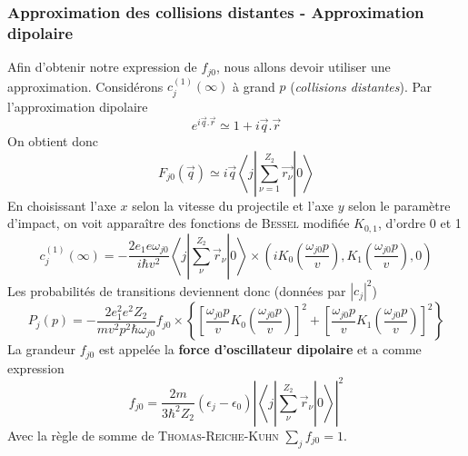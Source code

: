 \subsubsection{Approximation des collisions distantes - Approximation dipolaire}
Afin d'obtenir notre expression de $f_{j0}$, nous allons devoir utiliser une approximation. 
Considérons $c_j^{(1)}(\infty)$ à grand $p$ (\textit{collisions distantes}). Par l'approximation
dipolaire
\begin{equation}
e^{i\overrightarrow{q}.\overrightarrow{r}}\simeq 1+i\overrightarrow{q}.\overrightarrow{r}
\end{equation}
On obtient donc
\begin{equation}
F_{j0}(\overrightarrow{q})\simeq i\overrightarrow{q}\left\langle j\left| \sum_{\nu=1}^{Z_2}\overrightarrow{r_\nu}\right| 0\right\rangle
\end{equation}
En choisissant l'axe $x$ selon la vitesse du projectile et l'axe $y$ selon le paramètre 
d'impact, on voit apparaître des fonctions de \textsc{Bessel} modifiée $K_{0,1}$, d'ordre 0 et 1
\begin{equation}
c_j^{(1)}(\infty)=-\frac{2e_1e\omega_{j0}}{i\hbar v^2}\left\langle j\left| \sum_{\nu}^{Z_2}\overrightarrow{r}_\nu \right|0\right\rangle
 \times\left(iK_0\left(\frac{\omega_{j0}p}{v}\right),K_1\left(\frac{\omega_{j0}p}{v}\right),0\right)
\end{equation}
Les probabilités de transitions deviennent donc (données par $|c_j|^2$)
\begin{equation}
P_j(p)=-\frac{2e_1^2e^2Z_2}{mv^2p^2\hbar\omega_{j0}}f_{j0}
 \times\left\{\left[\frac{\omega_{j0}p}{v}K_0\left(\frac{\omega_{j0}p}{v}\right)\right]^2+\left[\frac{\omega_{j0}p}{v}K_1\left(\frac{\omega_{j0}p}{v}\right)\right]^2\right\}
\end{equation}
La grandeur $f_{j0}$ est appelée la \textbf{force d'oscillateur dipolaire} et a comme
expression
\begin{equation}
f_{j0}=\frac{2m}{3\hbar^2Z_2}(\epsilon_j-\epsilon_0)\left|\left\langle j\left|\sum_{\nu}^{Z_2}\overrightarrow{r}_\nu\right|0\right\rangle\right|^2
\end{equation}
Avec la règle de somme de \textsc{Thomas-Reiche-Kuhn} $\sum_j f_{j0}=1$.

